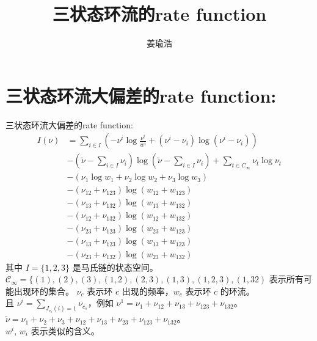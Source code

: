 \documentclass[cn,hazy,egreen,14pt,normal]{elegantnote}
\title{三状态环流的rate function}
\author{姜瑜浩}
\date{\zhtoday}
\begin{document}
\section{三状态环流大偏差的rate function:}
三状态环流大偏差的rate function:
\begin{align*}
    I(\nu) 
    &= \sum_{i \in I} \left(-\nu^{i} \log \frac{\nu^{i}}{w^{i}} + (\nu^{i} - \nu_{i}) \log(\nu^{i} - \nu_{i})\right) \\
    &-(\tilde{\nu} - \sum_{i \in I} \nu_i) \log (\tilde{\nu} - \sum_{i \in I} \nu_i)
    +\sum_{t \in C_{\infty}} \nu_t \log \nu_t \\
    &- (\nu_{1} \log w_{1} + \nu_{2} \log w_{2} + \nu_{3} \log w_{3})\\
    &- (\nu_{12} + \nu_{123}) \log(w_{12} + w_{123}) \\
    &- (\nu_{13} + \nu_{132}) \log(w_{13} + w_{132}) \\
    &- (\nu_{12} + \nu_{132}) \log(w_{12} + w_{132}) \\
    &- (\nu_{23} + \nu_{123}) \log(w_{23} + w_{123}) \\
    &- (\nu_{13} + \nu_{123}) \log(w_{13} + w_{123}) \\
    &- (\nu_{23} + \nu_{132}) \log(w_{23} + w_{132}) 
\end{align*}
其中 $I=\{1, 2, 3\}$ 是马氏链的状态空间。$\mathcal{C}_{\infty} = \{(1), (2), (3), (1,2), (2,3), (1,3), (1,2,3), (1, 32)$ 表示所有可能出现环的集合。
$\nu_c$ 表示环 $c$ 出现的频率，$w_c$ 表示环 $c$ 的环流。\\
且 $\nu^{i} = \sum_{J_{c_s}(i)=1} \nu_{c_s}$，例如 $\nu^{1} = \nu_{1} + \nu_{12} + \nu_{13} + \nu_{123} +\nu_{132}$。
$\tilde{\nu} = \nu_{1} + \nu_{2} + \nu_{3} + \nu_{12} + \nu_{13} + \nu_{23} + \nu_{123} +\nu_{132}$。\\
$w^i$, $w_i$ 表示类似的含义。
\end{document}
